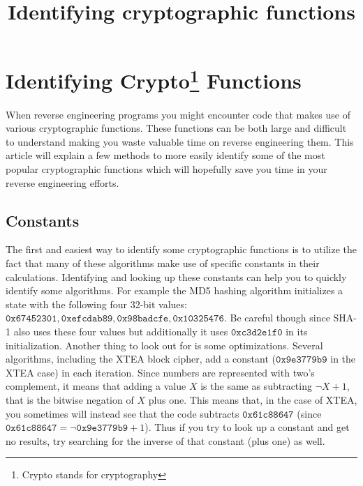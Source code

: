 \documentclass[twocolumn]{article}
\begin{document}
\title{Identifying cryptographic functions}
\date{}
\section*{Identifying Crypto\footnote{Crypto stands for cryptography} Functions}

When reverse engineering programs you might encounter code that makes use of various cryptographic functions. These functions can be both large and difficult to understand making you waste valuable time on reverse engineering them. This article will explain a few methods to more easily identify some of the most popular cryptographic functions which will hopefully save you time in your reverse engineering efforts.
\vspace*{-1.4\baselineskip}


\subsection*{Constants}
\vspace*{-0.2\baselineskip}

The first and easiest way to identify some cryptographic functions is to utilize the fact that many of these algorithms make use of specific constants in their calculations. Identifying and looking up these constants can help you to quickly identify some algorithms. For example the MD5 hashing algorithm initializes a state with the following four 32-bit values: $\mathtt{0x67452301, 0xefcdab89, 0x98badcfe, 0x10325476}$. Be careful though since SHA-1 also uses these four values but additionally it uses $\mathtt{0xc3d2e1f0}$ in its initialization. Another thing to look out for is some optimizations. Several algorithms, including the XTEA block cipher, add a constant ($\mathtt{0x9e3779b9}$ in the XTEA case) in each iteration. Since numbers are represented with two's complement, it means that adding a value $X$ is the same as subtracting $\lnot X+1$, that is the bitwise negation of $X$ plus one. This means that, in the case of XTEA, you sometimes will instead see that the code subtracts $\mathtt{0x61c88647}$ (since $\mathtt{0x61c88647} =  \lnot\mathtt{0x9e3779b9}+1$). Thus if you try to look up a constant and get no results, try searching for the inverse of that constant (plus one) as well.
\vspace*{-0.7\baselineskip}
\end{document}
